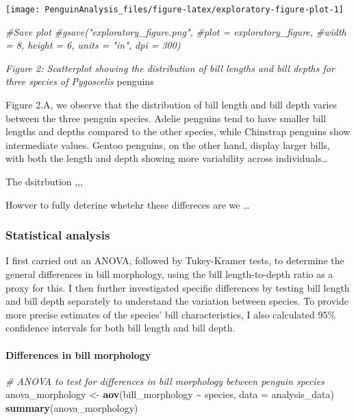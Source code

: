 \documentclass[
]{article}
\newenvironment{Shaded}{\begin{snugshade}}{\end{snugshade}}
\newcommand{\AttributeTok}[1]{\textcolor[rgb]{0.13,0.29,0.53}{#1}}
\newcommand{\CommentTok}[1]{\textcolor[rgb]{0.56,0.35,0.01}{\textit{#1}}}
\newcommand{\FunctionTok}[1]{\textcolor[rgb]{0.13,0.29,0.53}{\textbf{#1}}}
\newcommand{\NormalTok}[1]{#1}
\newcommand{\OtherTok}[1]{\textcolor[rgb]{0.56,0.35,0.01}{#1}}
\newcommand{\SpecialCharTok}[1]{\textcolor[rgb]{0.81,0.36,0.00}{\textbf{#1}}}
\begin{document}
\begin{center}\texttt{[image: PenguinAnalysis\_files/figure-latex/exploratory-figure-plot-1]} \end{center}

\begin{Shaded}
\begin{Highlighting}[]
\CommentTok{\#Save plot }
\CommentTok{\#gsave("exploratory\_figure.png", }
       \CommentTok{\#plot = exploratory\_figure, }
       \CommentTok{\#width = 8, height = 6, units = "in", dpi = 300)  }
\end{Highlighting}
\end{Shaded}

\emph{Figure 2: Scatterplot showing the distribution of bill lengths and
bill depths for three species of Pygoscelis} penguins

Figure 2.A, we observe that the distribution of bill length and bill
depth varies between the three penguin species. Adelie penguins tend to
have smaller bill lengths and depths compared to the other species,
while Chinstrap penguins show intermediate values. Gentoo penguins, on
the other hand, display larger bills, with both the length and depth
showing more variability across individuals\ldots{}

The dsitrbution ,,,

Howver to fully deterine whetehr these differeces are we \ldots{}

\subsubsection{Statistical analysis}\label{statistical-analysis-1}

I first carried out an ANOVA, followed by Tukey-Kramer tests, to
determine the general differences in bill morphology, using the bill
length-to-depth ratio as a proxy for this. I then further investigated
specific differences by testing bill length and bill depth separately to
understand the variation between species. To provide more precise
estimates of the species' bill characteristics, I also calculated 95\%
confidence intervals for both bill length and bill depth.

\paragraph{Differences in bill
morphology}\label{differences-in-bill-morphology}

\begin{Shaded}
\begin{Highlighting}[]
\CommentTok{\# ANOVA to test for differences in bill morphology between penguin species}
\NormalTok{anova\_morphology }\OtherTok{\textless{}{-}} \FunctionTok{aov}\NormalTok{(bill\_morphology }\SpecialCharTok{\textasciitilde{}}\NormalTok{ species, }\AttributeTok{data =}\NormalTok{ analysis\_data)}
\FunctionTok{summary}\NormalTok{(anova\_morphology)}
\end{Highlighting}
\end{Shaded}
\end{document}

